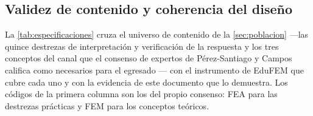 \subsection{Validez de contenido y coherencia del diseño}
\label{sec:contenido-didactico}

La \autoref{tab:especificaciones} cruza el universo de contenido de la \autoref{sec:poblacion} —las quince destrezas de interpretación y verificación de la respuesta y los tres conceptos del canal que el consenso de expertos de Pérez-Santiago y Campos califica como necesarios para el egresado \autocite[pp.~1162-1163]{perezsantiago2023fem}— con el instrumento de EduFEM que cubre cada uno y con la evidencia de este documento que lo demuestra. Los códigos de la primera columna son los del propio consenso: FEA para las destrezas prácticas y FEM para los conceptos teóricos.

